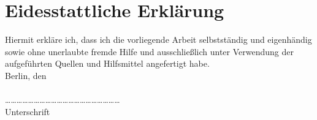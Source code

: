 \chapter*{Eidesstattliche Erklärung}
Hiermit erkläre ich, dass ich die vorliegende Arbeit selbstständig und eigenhändig sowie ohne unerlaubte fremde Hilfe und ausschließlich unter Verwendung der aufgeführten Quellen und Hilfsmittel angefertigt habe.\\

Berlin, den \todayGerman\\
\\

……………………………………………………\\
Unterschrift